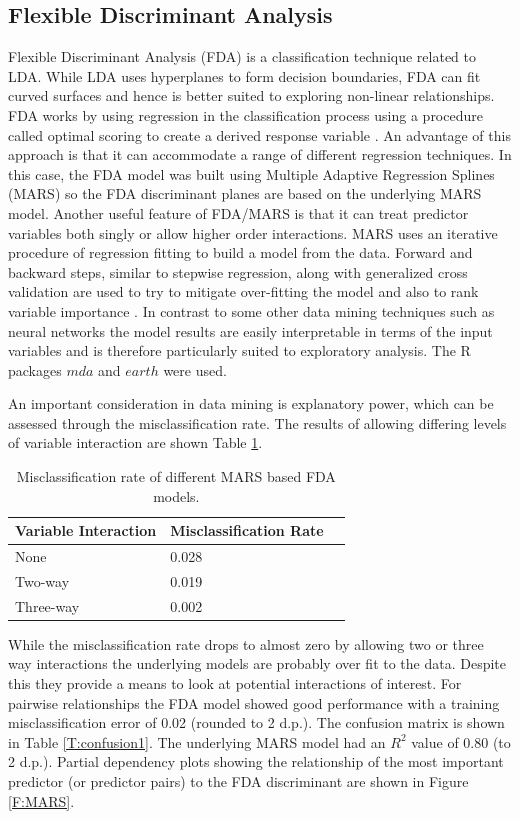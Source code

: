 \documentclass[a4paper, 12pt]{report}
\begin{document}
\subsection*{Flexible Discriminant Analysis}
Flexible Discriminant Analysis (\gls{FDA}) is a classification technique related to \gls{LDA}. While LDA uses hyperplanes to form decision boundaries, FDA can fit curved surfaces and hence is better suited to exploring non-linear relationships. FDA works by using regression in the classification process using a procedure called optimal scoring to create a derived response variable \cite{earth}. An advantage of this approach is that it can accommodate a range of different regression techniques. In this case, the FDA model was built using Multiple Adaptive Regression Splines (\gls{MARS}) so the FDA discriminant planes are based on the underlying MARS model. Another useful feature of FDA/MARS is that it can treat predictor variables both singly or allow higher order interactions. MARS uses an iterative procedure of regression fitting to build a model from the data. Forward and backward steps, similar to stepwise regression, along with generalized cross validation are used to try to mitigate over-fitting the model \cite{EOSL} and also to rank variable importance \cite{earth}. In contrast to some other data mining techniques such as neural networks the model results are easily interpretable in terms of the input variables and is therefore particularly suited to exploratory analysis. The R packages $mda$ \cite{mda} and $earth$ \cite{earth} were used.

An important consideration in data mining is explanatory power, which can be assessed through the misclassification rate. The results of allowing differing levels of variable interaction are shown Table \ref{T:MARSFIT}.

\begin{table}[h]
\centering
\begin{tabular}{lll}
  \hline
Variable Interaction & Misclassification Rate \\ 
  \hline
None &  0.028 \\ 
Two-way &  0.019 \\ 
Three-way & 0.002 \\
   \hline
\end{tabular}
\caption{Misclassification rate of different MARS based FDA models.} 
\label{T:MARSFIT}
\end{table}

While the misclassification rate drops to almost zero by allowing two or three way interactions the underlying models are probably over fit to the data. Despite this they provide a means to look at potential interactions of interest. For pairwise relationships the FDA model showed good performance with a training misclassification error of 0.02 (rounded to 2 d.p.). The confusion matrix is  shown in Table \ref{T:confusion1}.  The underlying MARS model had an $R^2$ value of 0.80 (to 2 d.p.). Partial dependency plots showing the relationship of the most important predictor (or predictor pairs) to the FDA discriminant are shown in Figure \ref{F:MARS}. 
\end{document}
